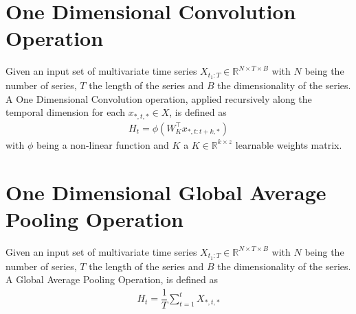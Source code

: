 \section{One Dimensional Convolution Operation}
Given an input set of multivariate time series $X_{t_1:T} \in \mathbb{R}^{N \times T \times B}$ with $N$ being the number of series, $T$ the length of the series and $B$ the dimensionality of the series. A One Dimensional Convolution operation, applied recursively along the temporal dimension for each $x_{*,t,*} \in X$, is defined as
\begin{gather}
    \label{1d_conv}
    H_t = \phi(W_{K}^\top x_{*,t : t+k,*})
\end{gather}
with $\phi$ being a non-linear function and $K$ a $K \in \mathbb{R}^{k \times z}$ learnable weights matrix.

\section{One Dimensional Global Average Pooling Operation}
Given an input set of multivariate time series $X_{t_1:T} \in \mathbb{R}^{N \times T \times B}$ with $N$ being the number of series, $T$ the length of the series and $B$ the dimensionality of the series. A Global Average Pooling Operation, is defined as
\begin{gather}
    \label{1d_pool}
    H_t = \dfrac{1}{T} \sum_{t=1}^{t}X_{*,t,*}
\end{gather}

